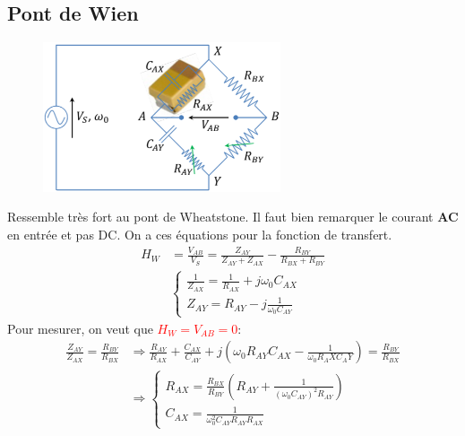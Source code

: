\documentclass{report}
\begin{document}
\subsection{Pont de Wien}
\begin{figure}
\centering
\includegraphics[width=7cm]{img/Wien.png}
\end{figure}
Ressemble très fort au pont de Wheatstone. Il faut bien remarquer le courant \textbf{AC} en entrée et pas DC. On a ces équations pour la fonction de transfert.
\begin{align*}
H_W &= \frac{V_{AB}}{V_S} = \frac{Z_{AY}}{Z_{AY} + Z_{AX}} - \frac{R_{BY}}{R_{BX} + R_{BY}}\\
& \begin{cases}
\frac{1}{Z_{AX}} = \frac{1}{R_{AX}} + j \omega_0 C_{AX}\\
Z_{AY} = R_{AY} - j \frac{1}{\omega_0 C_{AY}}
\end{cases}
\end{align*}
Pour mesurer, on veut que \textcolor{red}{$H_W = V_{AB} = 0$}:
\begin{align*}
\frac{Z_{AY}}{Z_{AX}} = \frac{R_{BY}}{R_{BX}} & \Longrightarrow \frac{R_{AY}}{R_{AX}} + \frac{C_{AX}}{C_{AY}} + j \left( \omega_0 R_{AY} C_{AX} - \frac{1}{\omega_0 R_AX C_AY} \right) = \frac{R_{BY}}{R_{BX}}\\
& \Longrightarrow \begin{cases}
R_{AX} = \frac{R_{BX}}{R_{BY}} \left( R_{AY} + \frac{1}{(\omega_0 C_{AY})^2 R_{AY}} \right)\\
C_{AX} = \frac{1}{\omega_0^2 C_{AY} R_{AY} R_{AX}}
\end{cases}
\end{align*}
\newpage
\end{document}
